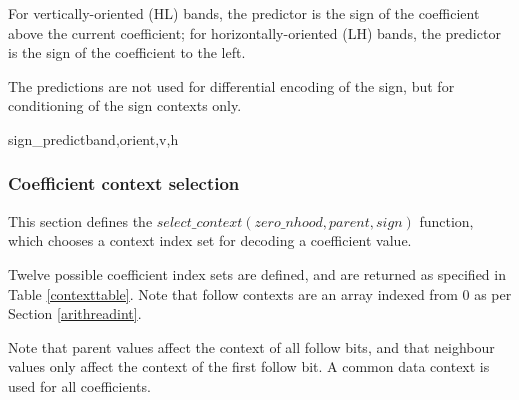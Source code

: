 For vertically-oriented (HL) bands, the predictor is the sign of the
coefficient above the current coefficient; for horizontally-oriented (LH)
bands, the predictor is the sign of the coefficient to the left. 

The predictions are not used for differential encoding of the sign, but for
conditioning of the sign contexts only.

\begin{pseudo}{sign\_predict}{band,orient,v,h}
  \bsELSE
  \bsEND
{}
  \bsELSE
  \bsEND
\bsELSE
\bsEND{}
\end{pseudo}

\subsubsection{Coefficient context selection}
\label{selectcoeffcontext}

This section defines the $select\_context(zero\_nhood, parent, sign)$
function, which chooses a context index set for decoding a coefficient value.

Twelve possible coefficient index sets are defined, and are returned as specified 
in Table \ref{contexttable}. Note that follow contexts are an array indexed from $0$
as per Section \ref{arithreadint}.

Note that parent values affect the context of all follow bits, and that neighbour
values only affect the context of the first follow bit. A common data context is used
for all coefficients.

